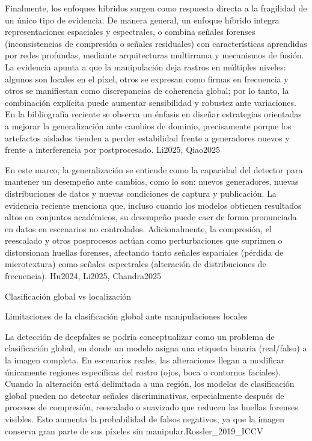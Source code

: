 Finalmente, los enfoques híbridos surgen como respuesta directa a la fragilidad de un único tipo de evidencia. De manera general, un enfoque híbrido integra representaciones espaciales y espectrales, o combina señales forenses (inconsistencias de compresión o señales residuales) con características aprendidas por redes profundas, mediante arquitecturas multirrama y mecanismos de fusión. La evidencia apunta a que la manipulación deja rastros en múltiples niveles: algunos son locales en el píxel, otros se expresan como firmas en frecuencia y otros se manifiestan como discrepancias de coherencia global; por lo tanto, la combinación explícita puede aumentar sensibilidad y robustez ante variaciones. En la bibliografía reciente se observa un énfasis en diseñar estrategias orientadas a mejorar la generalización ante cambios de dominio, precisamente porque los artefactos aislados tienden a perder estabilidad frente a generadores nuevos y frente a interferencia por postprocesado. Li2025, Qiao2025
 
En este marco, la generalización se entiende como la capacidad del detector para mantener un desempeño ante cambios, como lo son: nuevos generadores, nuevas distribuciones de datos y nuevas condiciones de captura y publicación. La evidencia reciente menciona que, incluso cuando los modelos obtienen resultados altos en conjuntos académicos, su desempeño puede caer de forma pronunciada en datos en escenarios no controlados. Adicionalmente, la compresión, el reescalado y otros posprocesos actúan como perturbaciones que suprimen o distorsionan huellas forenses, afectando tanto señales espaciales (pérdida de microtextura) como señales espectrales (alteración de distribuciones de frecuencia). Hu2024, Li2025, Chandra2025

Clasificación global vs localización

Limitaciones de la clasificación global ante manipulaciones locales

La detección de deepfakes se podría conceptualizar como un problema de clasificación global, en donde un modelo asigna una etiqueta binaria (real/falso) a la imagen completa. En escenarios reales, las alteraciones llegan a modificar únicamente regiones específicas del rostro (ojos, boca o contornos faciales). Cuando la alteración está delimitada a una región, los modelos de clasificación global pueden no detectar señales discriminativas, especialmente después de procesos de compresión, reescalado o suavizado que reducen las huellas forenses visibles. Esto aumenta la probabilidad de falsos negativos, ya que la imagen conserva gran parte de sus píxeles sin manipular.Rossler_2019_ICCV


